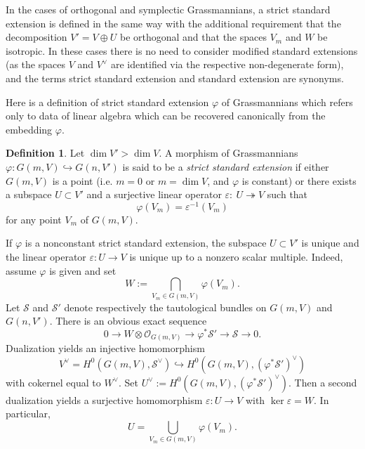 \documentclass[12pt]{amsart}
\renewcommand{\phi}{\varphi}
\theoremstyle{definition}
\newtheorem{definition}[theorem]{Definition}
\begin{document}
In the cases of orthogonal and symplectic Grassmannians, a 
strict standard extension is defined in the same way with the 
additional requirement that the decomposition $V'=V\oplus U$
be orthogonal and that the spaces $V_m$ and $W$ be isotropic.
In these cases there is no need to consider modified standard
extensions (as the spaces $V$ and $V^{\vee}$ are identified via
the respective non-degenerate form), and the terms strict 
standard extension and standard extension are synonyms.

Here is a definition of strict standard extension $\varphi$
of Grassmannians which refers only to data of linear 
algebra which can be recovered canonically from the embedding
$\varphi$.

\begin{definition}\label{strict}
Let $\dim V'>\dim V$.
A morphism of Grassmannians $\varphi:G(m,V)\hookrightarrow 
G(n,V')$ is said to be a \textit{strict standard extension} 
if either $G(m,V)$ is a point (i.e. $m=0$ or $m=\dim V$, and 
$\phi$ is constant) or there exists a subspace $U\subset V'$ 
and a surjective linear operator $\varepsilon:\ 
U\twoheadrightarrow V$ such that
\begin{equation}\label{eta, eps}
\varphi(V_m)=\varepsilon^{-1}(V_m)
\end{equation} 
for any point $V_m$ of $G(m,V)$.
\end{definition} 
\noindent

If $\phi$ is a nonconstant strict standard extension, the subspace 
$U\subset V'$ is unique and the linear operator $\varepsilon:U
\to V$ is unique up to a nonzero scalar multiple. Indeed, assume 
$\phi$ is given and set 
\begin{equation}\label{descriptn  of W}
W:=\underset{V_m\in G(m,V)}{\bigcap} \varphi(V_m).
\end{equation} 
Let $\mathcal{S}$ and $\mathcal{S}'$ denote respectively
the tautological bundles on $G(m,V)$ and $G(n,V')$. There is an
obvious exact sequence
$$
0\to W\otimes\mathcal{O}_{G(m,V)}\to\phi^*\mathcal{S}'\to 
\mathcal{S}\to0.
$$
Dualization yields an injective homomorphism 
$$
V^{\vee}=H^0(G(m,V),\mathcal{S}^{\vee})\hookrightarrow 
H^0(G(m,V),(\phi^*\mathcal{S}')^{\vee})
$$ 
with cokernel equal to $W^{\vee}$. Set $U^{\vee}:=
H^0(G(m,V),(\phi^*\mathcal{S}')^{\vee})$. Then a second dualization 
yields a surjective homomorphism $\varepsilon:U\to V$ with 
$\ker\varepsilon=W$. In particular,
\begin{equation}\label{descriptn  of U}
U=\underset{V_m\in G(m,V)}{\bigcup} \varphi(V_m).
\end{equation}
\end{document}
